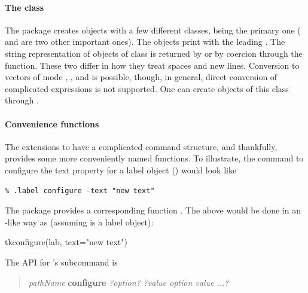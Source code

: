 \paragraph{The  class}
The  package creates objects with a few different classes,
 being the primary one ( and 
are two other important ones).  The  objects print with
the leading . The string representation of objects of
class  is returned by  or by coercion
through the  function. These two differ in how
they treat spaces and new lines.  Conversion to vectors of mode
, ,  and 
is possible, though, in general, direct conversion of complicated
\TCL\/ expressions is not supported. One can create objects of this
class through .



\paragraph{Convenience functions}
The \TK\/ extensions to \TCL\/ have a complicated command structure,
and thankfully,  provides some more conveniently named
functions. To illustrate, the \TCL\/ command to configure the text property for
a label object () would look like
\begin{verbatim}
% .label configure -text "new text"
\end{verbatim}
The  package provides a corresponding function
. The above would be done in an \R-like way as (assuming  is a
label object):


\begin{Schunk}
\begin{Sinput}
 tkconfigure(lab, text="new text")
\end{Sinput}
\end{Schunk}




The \TK\/ API for 's  subcommand is

\begin{quotation}
  \textit{pathName} \textbf{configure} \textit{?option? ?value option value ...?}
\end{quotation}

